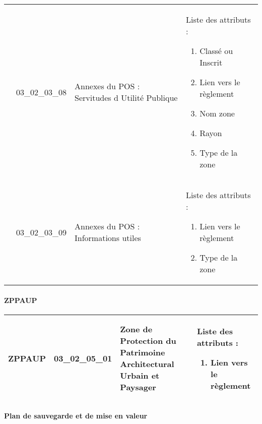 \documentclass[12pt,titlepage,oneside]{book}
\begin{document}
\begin{supertabular}{|p{10cm}|c|p{13cm}|p{12cm}|}
                    & 03\_02\_03\_08 & Annexes du POS : Servitudes d Utilité Publique & Liste des attributs :
\begin{enumerate}
  \item Classé ou Inscrit  \item Lien vers le règlement  \item Nom zone  \item Rayon  \item Type de la zone\end{enumerate}
\\


                    & 03\_02\_03\_09 & Annexes du POS : Informations utiles & Liste des attributs :
\begin{enumerate}
  \item Lien vers le règlement  \item Type de la zone\end{enumerate}
\\
\hline
\end{supertabular}
\begin{figure}[h!]
  \hfill         %
\end{figure}


\paragraph{ZPPAUP}
\noindent
\vspace{\baselineskip}

\renewcommand{\arraystretch}{1.2}
\begin{supertabular}{|p{10cm}|c|p{13cm}|p{12cm}|}
 ZPPAUP & 03\_02\_05\_01 & Zone de Protection du Patrimoine Architectural Urbain et Paysager & Liste des attributs :
\begin{enumerate}
  \item Lien vers le règlement\end{enumerate}
\\
\hline
\end{supertabular}
\begin{figure}[h!]
  \hfill         %
\end{figure}


\paragraph{Plan de sauvegarde et de mise en valeur}
\noindent
\vspace{\baselineskip}
\end{document}
